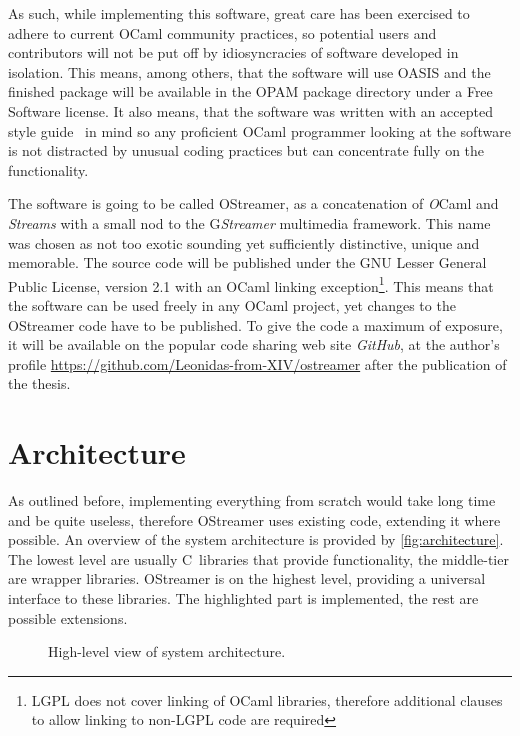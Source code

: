 \documentclass[parskip=half]{scrreprt}
\begin{document}
As such, while implementing this software, great care has been exercised to
adhere to current OCaml community practices, so potential users and
contributors will not be put off by idiosyncracies of software developed in
isolation. This means, among others, that the software will use OASIS and the
finished package will be available in the OPAM package directory under a Free
Software license. It also means, that the software was written with an accepted
style guide~\cite{ocamlstyle} in mind so any proficient OCaml programmer
looking at the software is not distracted by unusual coding practices but can
concentrate fully on the functionality.

The software is going to be called OStreamer, as a concatenation of
\emph{O}Caml and \emph{Streams} with a small nod to the G\emph{Streamer}
multimedia framework. This name was chosen as not too exotic sounding yet
sufficiently distinctive, unique and memorable. The source code will be
published under the GNU Lesser General Public License, version 2.1 with an
OCaml linking exception\footnote{LGPL does not cover linking of OCaml
libraries, therefore additional clauses to allow linking to non-LGPL code are
required}. This means that the software can be used freely in any OCaml
project, yet changes to the OStreamer code have to be published. To give the
code a maximum of exposure, it will be available on the popular code sharing
web site \emph{GitHub}, at the author's profile
\url{https://github.com/Leonidas-from-XIV/ostreamer} after the publication of
the thesis.

\section{Architecture}
\label{sec:architecture}

As outlined before, implementing everything from scratch would take long time
and be quite useless, therefore OStreamer uses existing code, extending it
where possible. An overview of the system architecture is provided by
\autoref{fig:architecture}. The lowest level are usually C~libraries that
provide functionality, the middle-tier are wrapper libraries. OStreamer is on
the highest level, providing a universal interface to these libraries. The
highlighted part is implemented, the rest are possible extensions.

\begin{figure}[h]
  \centering
  
  \caption{High-level view of system architecture.}
  \label{fig:architecture}
\end{figure}
\end{document}
